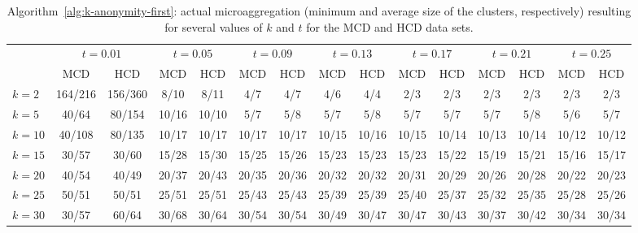 \documentclass[10pt,journal,compsoc]{IEEEtran}
\theoremstyle{definition}
\theoremstyle{plain}
\begin{document}
\begin{table*}
\caption{\label{tab:k-anonymity-first}Algorithm~\ref{alg:k-anonymity-first}: actual microaggregation (minimum and average
size of the clusters, respectively) resulting for several values of $k$ and $t$ for the MCD and HCD data sets.}
\centering
\scriptsize
\begin{tabular}{|l|cc|cc|cc|cc|cc|cc|cc|}\hline
 & \multicolumn{2}{c|}{$t=0.01$} & \multicolumn{2}{c|}{$t=0.05$} & \multicolumn{2}{c|}{$t=0.09$} & \multicolumn{2}{c|}{$t=0.13$} & \multicolumn{2}{c|}{$t=0.17$} & \multicolumn{2}{c|}{$t=0.21$} & \multicolumn{2}{c|}{$t=0.25$}\\
& MCD & HCD & MCD & HCD & MCD & HCD & MCD & HCD & MCD & HCD & MCD & HCD & MCD & HCD\\
\hline
$k=2$ & 164/216 & 156/360  & 8/10 & 8/11  & 4/7 & 4/7 & 4/6 & 4/4 & 2/3 & 2/3 & 2/3 & 2/3 & 2/3 & 2/3 \\
$k=5$ & 40/64 & 80/154  & 10/16 & 10/10  & 5/7 & 5/8 & 5/7 & 5/8 & 5/7 & 5/7 & 5/7 & 5/8 & 5/6 & 5/7 \\
$k=10$ & 40/108 & 80/135  & 10/17 & 10/17  & 10/17 & 10/17 & 10/15 & 10/16 & 10/15 & 10/14 & 10/13 & 10/14 & 10/12 & 10/12 \\
$k=15$ & 30/57 & 30/60  & 15/28 & 15/30  & 15/25 & 15/26 & 15/23 & 15/23 & 15/23 & 15/22 & 15/19 & 15/21 & 15/16 & 15/17 \\
$k=20$ & 40/54 & 40/49  & 20/37 & 20/43  & 20/35 & 20/36 & 20/32 & 20/32 & 20/31 & 20/29 & 20/26 & 20/28 & 20/22 & 20/23 \\
$k=25$ & 50/51 & 50/51  & 25/51 & 25/51  & 25/43 & 25/43 & 25/39 & 25/39 & 25/40 & 25/37 & 25/32 & 25/35 & 25/28 & 25/26 \\
$k=30$ & 30/57 & 60/64  & 30/68 & 30/64  & 30/54 & 30/54 & 30/49 & 30/47 & 30/47 & 30/43 & 30/37 & 30/42 & 30/34 & 30/34 \\
\hline
\end{tabular}
\end{table*} 
\end{document}
